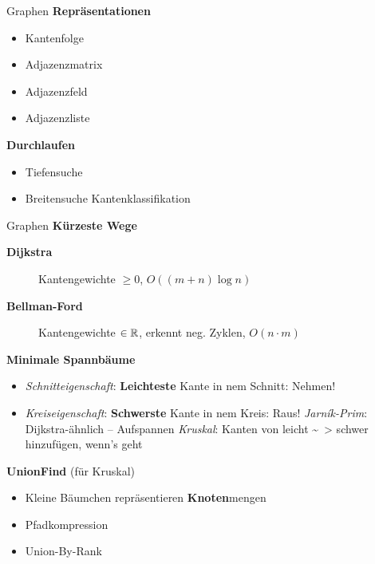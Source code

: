 \begin{frame}{Graphen}
	\textbf{Repräsentationen} 
	\pause
	\begin{itemize}
		\item Kantenfolge
		\item Adjazenzmatrix
		\item Adjazenzfeld
		\item Adjazenzliste
	\end{itemize}
	
	\textbf{Durchlaufen}
	\begin{itemize}
		\item Tiefensuche
		\item Breitensuche
		\implitem Kantenklassifikation
	\end{itemize}
\end{frame}

\begin{frame}{Graphen}
	\textbf{Kürzeste Wege}
	\begin{description}
		\item[\textbf{Dijkstra}] Kantengewichte $\geq 0$, \quad $O((m+n) \log n)$
		\item[\quad\textbf{Bellman-Ford}] Kantengewichte $\in \mathbb{R}$, erkennt neg. Zyklen, \quad $O(n \cdot m)$
	\end{description}
	\pause
	\textbf{Minimale Spannbäume}
	\begin{itemize}
		\item \emph{Schnitteigenschaft}: \textbf{Leichteste} Kante in nem Schnitt: Nehmen!
		\item \emph{Kreiseigenschaft}: \textbf{Schwerste} Kante in nem Kreis: Raus!
		\implitem \emph{Jarník-Prim}: Dijkstra-ähnlich – Aufspannen
		\implitem \emph{Kruskal}: Kanten von leicht \~~> schwer hinzufügen, wenn's geht
	\end{itemize}
	\pause
	\textbf{UnionFind} (für Kruskal)
	\begin{itemize}
		\item Kleine Bäumchen repräsentieren \textbf{Knoten}mengen
		\item Pfadkompression
		\item Union-By-Rank
	\end{itemize}
\end{frame}



